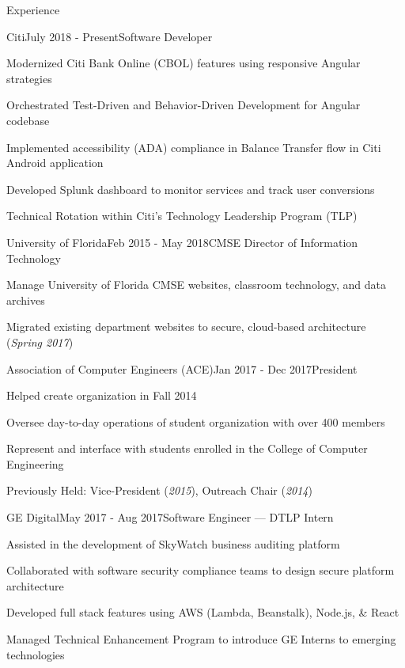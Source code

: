 \documentclass{resume} %
\begin{document}
\begin{rSection}{Experience}

\begin{rSubsection}{Citi}{July 2018 - Present}{Software Developer}{}
\setlength{\itemindent}{.25in}
\item Modernized Citi Bank Online (CBOL) features using responsive Angular strategies
\item Orchestrated Test-Driven and Behavior-Driven Development for Angular codebase
\item Implemented accessibility (ADA) compliance in Balance Transfer flow in Citi Android application
\item Developed Splunk dashboard to monitor services and track user conversions
\item Technical Rotation within Citi's Technology Leadership Program (TLP)
\end{rSubsection}

\begin{rSubsection}{University of Florida}{Feb 2015 - May 2018}{CMSE Director of Information Technology}{}
\setlength{\itemindent}{.25in}
\item Manage University of Florida CMSE websites, classroom technology, and data archives
\item Migrated existing department websites to secure, cloud-based architecture (\textit{Spring 2017})
\end{rSubsection}

\begin{rSubsection}{Association of Computer Engineers (ACE)}{Jan 2017 - Dec 2017}{President}{}
\setlength{\itemindent}{.25in}
\item Helped create organization in Fall 2014
\item Oversee day-to-day operations of student organization with over 400 members
\item Represent and interface with students enrolled in the College of Computer Engineering
\item Previously Held: Vice-President (\textit{2015}), Outreach Chair (\textit{2014})
\end{rSubsection}

\begin{rSubsection}{GE Digital}{May 2017 - Aug 2017}{Software Engineer --- DTLP Intern}{}
\setlength{\itemindent}{.25in}
\item Assisted in the development of SkyWatch business auditing platform
\item Collaborated with software security compliance teams to design secure platform architecture
\item Developed full stack features using AWS (Lambda, Beanstalk), Node.js, \& React
\item Managed Technical Enhancement Program to introduce GE Interns to emerging technologies
\end{rSubsection}


\end{rSection}
\end{document}
